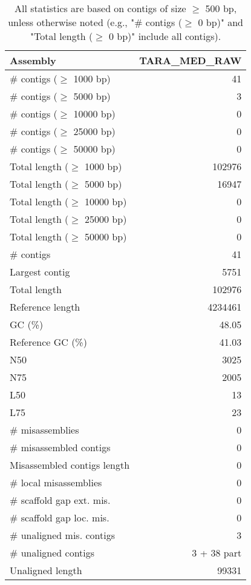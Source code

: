 \documentclass[12pt,a4paper]{article}
\begin{document}
\begin{table}[ht]
\begin{center}
\caption{All statistics are based on contigs of size $\geq$ 500 bp, unless otherwise noted (e.g., "\# contigs ($\geq$ 0 bp)" and "Total length ($\geq$ 0 bp)" include all contigs).}
\begin{tabular}{|l*{1}{|r}|}
\hline
Assembly & TARA\_MED\_RAW \\ \hline
\# contigs ($\geq$ 1000 bp) & 41 \\ \hline
\# contigs ($\geq$ 5000 bp) & 3 \\ \hline
\# contigs ($\geq$ 10000 bp) & 0 \\ \hline
\# contigs ($\geq$ 25000 bp) & 0 \\ \hline
\# contigs ($\geq$ 50000 bp) & 0 \\ \hline
Total length ($\geq$ 1000 bp) & 102976 \\ \hline
Total length ($\geq$ 5000 bp) & 16947 \\ \hline
Total length ($\geq$ 10000 bp) & 0 \\ \hline
Total length ($\geq$ 25000 bp) & 0 \\ \hline
Total length ($\geq$ 50000 bp) & 0 \\ \hline
\# contigs & 41 \\ \hline
Largest contig & 5751 \\ \hline
Total length & 102976 \\ \hline
Reference length & 4234461 \\ \hline
GC (\%) & 48.05 \\ \hline
Reference GC (\%) & 41.03 \\ \hline
N50 & 3025 \\ \hline
N75 & 2005 \\ \hline
L50 & 13 \\ \hline
L75 & 23 \\ \hline
\# misassemblies & 0 \\ \hline
\# misassembled contigs & 0 \\ \hline
Misassembled contigs length & 0 \\ \hline
\# local misassemblies & 0 \\ \hline
\# scaffold gap ext. mis. & 0 \\ \hline
\# scaffold gap loc. mis. & 0 \\ \hline
\# unaligned mis. contigs & 3 \\ \hline
\# unaligned contigs & 3 + 38 part \\ \hline
Unaligned length & 99331 \\ \hline

\end{tabular}
\end{center}
\end{table}
\end{document}

